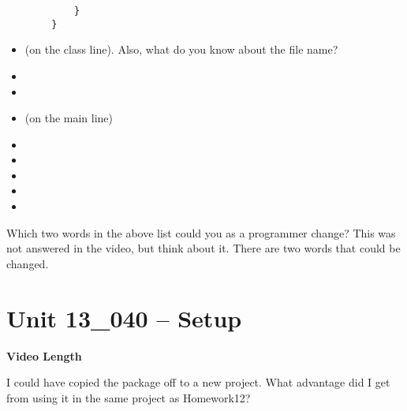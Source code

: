 \documentclass[letterpaper,12pt]{exam}
\newcommand{\unit}{Unit 13}
\begin{document}
\begin{questions}
\begin{samepage}
\begin{verbatim}
            }
        }
    \end{verbatim}
      \begin{itemize}
        \item {} (on the class line). Also, what do you know about the file name?
        \vspace{5mm}
        \item {}
        \vspace{5mm}
        \item {}
        \vspace{5mm}
        \item {} (on the main line)
        \vspace{5mm}
        \item {}
        \vspace{5mm}
        \item {}
        \vspace{5mm}
        \item {}
        \vspace{5mm}
        \item {}
        \vspace{5mm}
        \item {}
        \vspace{5mm}
       \end{itemize}
\end{samepage}

\begin{samepage}
    \question Which two words in the above list could you as a programmer change? This was not answered in the video, but think about it.  There are two words that could be changed.
    \vspace{5mm}
\end{samepage}

\section*{\unit\_040 -- Setup} 
\par{\selectfont\textbf{Video Length }}

\begin{samepage}
    \question I could have copied the package off to a new project.  What advantage did I get from using it in the same project as Homework12?
    \vspace{5mm}
\end{samepage}


\end{questions}
\end{document}
